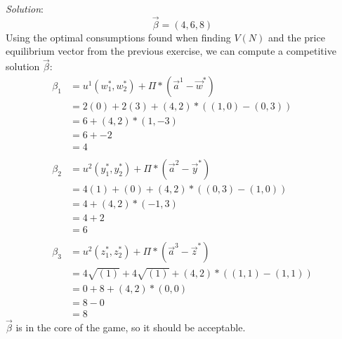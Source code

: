 \documentclass{article}
\begin{document}
\begin{enumerate}
\begin{enumerate}
    \textit{Solution}: \\
    \[ \vec{\beta} = (4, 6, 8) \]
    Using the optimal consumptions found when finding $V(N)$ and the price equilibrium vector from the previous exercise, we can compute a competitive solution $\vec{\beta}$:
    \begin{align*}
    \beta_{1} &= u^{1}(w_{1}^{*}, w_{2}^{*}) + \Pi    * (\vec{a}^{1} - \vec{w}^{*}) \\
              &= 2(0) + 2(3)                 + (4, 2) * ((1, 0)      - (0, 3)) \\
              &= 6                           + (4, 2) * (1, -3) \\
              &= 6                           + -2 \\
              &= 4 \\\\
    \beta_{2} &= u^{2}(y_{1}^{*}, y_{2}^{*}) + \Pi    * (\vec{a}^{2} - \vec{y}^{*}) \\
              &= 4(1) + (0)                  + (4, 2) * ((0, 3)      - (1, 0)) \\
              &= 4                           + (4, 2) * (-1, 3) \\
              &= 4                           + 2 \\
              &= 6 \\\\
    \beta_{3} &= u^{2}(z_{1}^{*}, z_{2}^{*}) + \Pi    * (\vec{a}^{3} - \vec{z}^{*}) \\
              &= 4\sqrt{(1)} + 4\sqrt{(1)}   + (4, 2) * ((1, 1)      - (1, 1)) \\
              &= 0           + 8             + (4, 2) * (0, 0) \\
              &= 8                           - 0 \\
              &= 8
    \end{align*}
    $\vec{\beta}$ is in the core of the game, so it should be acceptable.

    \end{enumerate}

\end{enumerate}
%
\end{document}
